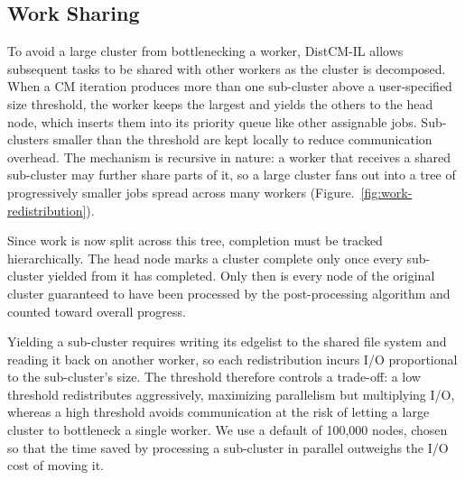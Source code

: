 \documentclass[pdflatex,lib/sn-mathphys-num]{lib/sn-jnl}%
\theoremstyle{thmstyleone}%
\theoremstyle{thmstyletwo}%
\theoremstyle{thmstylethree}%
\begin{document}
\subsection{Work Sharing} \label{sec:work-sharing}
To avoid a large cluster from bottlenecking a worker, DistCM-IL allows subsequent tasks to be shared with other workers as the cluster is decomposed. When a CM iteration produces more than one sub-cluster above a user-specified size threshold, the worker keeps the largest and yields the others to the head node, which inserts them into its priority queue like other assignable jobs. Sub-clusters smaller than the threshold are kept locally to reduce communication overhead. The mechanism is recursive in nature: a worker that receives a shared sub-cluster may further share parts of it, so a large cluster fans out into a tree of progressively smaller jobs spread across many workers (Figure.~\ref{fig:work-redistribution}).

Since work is now split across this tree, completion must be tracked hierarchically. The head node marks a cluster complete only once every sub-cluster yielded from it has completed. Only then is every node of the original cluster guaranteed to have been processed by the post-processing algorithm and counted toward overall progress.

Yielding a sub-cluster requires writing its edgelist to the shared file system and reading it back on another worker, so each redistribution incurs I/O proportional to the sub-cluster's size. The threshold therefore controls a trade-off: a low threshold redistributes aggressively, maximizing parallelism but multiplying I/O, whereas a high threshold avoids communication at the risk of letting a large cluster to bottleneck a single worker. We use a default of 100,000 nodes, chosen so that the time saved by processing a sub-cluster in parallel outweighs the I/O cost of moving it.
\end{document}
